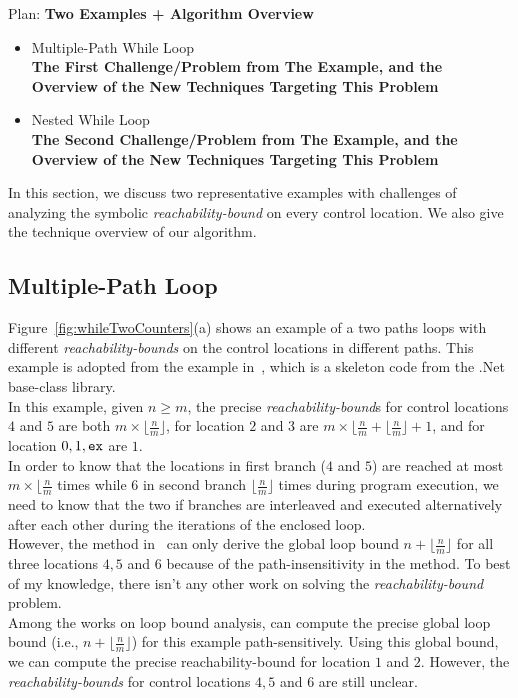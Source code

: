 Plan:
\textbf{Two Examples + Algorithm Overview}
\begin{itemize}
\item {Multiple-Path While Loop}
\\
\textbf{The First Challenge/Problem from The Example, 
and the Overview of the New Techniques Targeting This Problem}
\item {Nested While Loop}
\\
\textbf{The Second Challenge/Problem from The Example,
and the Overview of the New Techniques Targeting This Problem}
\end{itemize}
In this section, we discuss two representative examples with
challenges of analyzing the symbolic
\emph{reachability-bound} on
every control location.
We also give the technique overview of our algorithm.
%
\subsection{Multiple-Path Loop}
\label{sec:overview-multiplepath}

Figure~\ref{fig:whileTwoCounters}(a) shows an example of a two paths loops
with different \emph{reachability-bounds} on the control locations in different paths.
This example is adopted from the example in~\cite{Sumit2010rechability}, which
is a skeleton code from the .Net base-class library.
\\
In this example, given $n \geq m$,
the precise \emph{reachability-bound}s for control locations $4$ and $5$ are both $m \times \lfloor\frac{n}{m}\rfloor$,
for location $2$ and $3$ are $m \times \lfloor\frac{n}{m} + \lfloor\frac{n}{m}\rfloor + 1$, 
and for location $0, 1, {\mathtt{ex}}$ are $1$.
\\
In order to know that the locations in first branch ($4$ and $5$) are reached at most $m \times \lfloor\frac{n}{m}$ times
while $6$ in second branch $\lfloor\frac{n}{m}\rfloor$ times
 during program execution,
we need to know that the two if branches are interleaved and executed alternatively after each other
during the iterations of the enclosed loop.
\\
However, the method in~\cite{Sumit2010rechability}
can only derive the global loop bound $n + \lfloor\frac{n}{m}\rfloor$
for all three locations $4, 5$ and $6$ because of the path-insensitivity in the method.
To best of my knowledge, there isn't any other work on solving the \emph{reachability-bound} problem.
\\
Among the works on loop bound analysis, \cite{GulwaniJK09} can compute the precise global
loop bound (i.e., $n + \lfloor\frac{n}{m}\rfloor$) for this example path-sensitively.
Using this global bound, we can compute the precise reachability-bound for location $1$ and $2$.
However, the  \emph{reachability-bounds} for control locations $4, 5$ and $6$ are still unclear.
